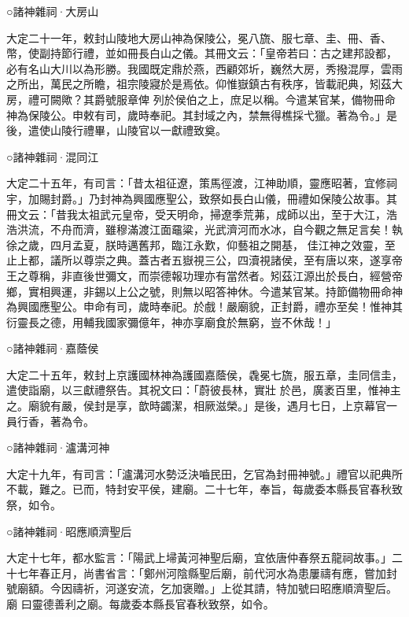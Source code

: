 \begin{pinyinscope}
 ○諸神雜祠·大房山



 大定二十一年，敕封山陵地大房山神為保陵公，冕八旒、服七章、圭、冊、香、幣，使副持節行禮，並如冊長白山之儀。其冊文云：「皇帝若曰：古之建邦設都，必有名山大川以為形勝。我國既定鼎於燕，西顧郊圻，巍然大房，秀撥混厚，雲雨之所出，萬民之所瞻，祖宗陵寢於是焉依。仰惟嶽鎮古有秩序，皆載祀典，矧茲大房，禮可闕歟？其爵號服章俾
 列於侯伯之上，庶足以稱。今遣某官某，備物冊命神為保陵公。申敕有司，歲時奉祀。其封域之內，禁無得樵採弋獵。著為令。」是後，遣使山陵行禮畢，山陵官以一獻禮致奠。



 ○諸神雜祠·混同江



 大定二十五年，有司言：「昔太祖征遼，策馬徑渡，江神助順，靈應昭著，宜修祠宇，加賜封爵。」乃封神為興國應聖公，致祭如長白山儀，冊禮如保陵公故事。其冊文云：「昔我太祖武元皇帝，受天明命，掃遼季荒茀，成師以出，至于大江，浩浩洪流，不舟而濟，雖穆滿渡江面黿粱，光武濟河而水冰，自今觀之無足言矣！執徐之歲，四月孟夏，朕時邁舊邦，臨江永歎，仰藝祖之開基，
 佳江神之效靈，至止上都，議所以尊崇之典。蓋古者五嶽視三公，四瀆視諸侯，至有唐以來，遂享帝王之尊稱，非直後世彌文，而崇德報功理亦有當然者。矧茲江源出於長白，經營帝鄉，實相興運，非錫以上公之號，則無以昭答神休。今遣某官某。持節備物冊命神為興國應聖公。申命有司，歲時奉祀。於戲！嚴廟貌，正封爵，禮亦至矣！惟神其衍靈長之德，用輔我國家彌億年，神亦享廟食於無窮，豈不休哉！」



 ○諸神雜祠·嘉蔭侯



 大定二十五年，敕封上京護國林神為護國嘉蔭侯，毳冕七旒，服五章，圭同信圭，遣使詣廟，以三獻禮祭告。其祝文曰：「蔚彼長林，實壯
 於邑，廣袤百里，惟神主之。廟貌有嚴，侯封是享，歆時蠲潔，相厥滋榮。」是後，遇月七日，上京幕官一員行香，著為令。



 ○諸神雜祠·瀘溝河神



 大定十九年，有司言：「瀘溝河水勢泛決嚙民田，乞官為封冊神號。」禮官以祀典所不載，難之。已而，特封安平侯，建廟。二十七年，奉旨，每歲委本縣長官春秋致祭，如令。



 ○諸神雜祠·昭應順濟聖后



 大定十七年，都水監言：「陽武上埽黃河神聖后廟，宜依唐仲春祭五龍祠故事。」二十七年春正月，尚書省言：「鄭州河陰縣聖后廟，前代河水為患屢禱有應，嘗加封號廟額。今因禱祈，河遂安流，乞加褒贈。」上從其請，特加號曰昭應順濟聖后。廟
 曰靈德善利之廟。每歲委本縣長官春秋致祭，如令。




\end{pinyinscope}
